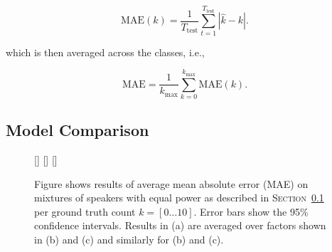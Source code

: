 \begin{equation}
  \mbox{MAE}(k) = \frac{1}{T_{\textrm{test}}} \sum_{t=1}^{T_\textrm{test}}\left| \hat{k} - k \right|.
\end{equation}

which is then averaged across the classes, i.e.,

\begin{equation}
  \mbox{MAE} = \frac{1}{k_{\max}} \sum_{k=0}^{k_{\max}} \mbox{MAE}(k).
\end{equation}


\subsection{Model Comparison}%
\label{ssec:model_comparsion}

\begin{figure}
\centering
{}
[\textwidth]{}%
\hspace{0.2\textwidth} %
[\textwidth]{}%
\hspace{0.2\textwidth} %
[\textwidth]{}%
\caption[Short Caption]{Figure shows results of average mean absolute error (MAE) on mixtures of speakers with equal power as described in \textsc{Section~\ref{ssec:model_comparsion}} per ground truth count \(k=[0\ldots10]\). Error bars show the 95\% confidence intervals. Results in (a) are averaged over factors shown in (b) and (c) and similarly for (b) and (c).}
\label{fig:fixed-gain-results}
\end{figure}

